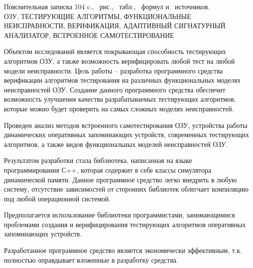 \thispagestyle{empty}

\begin{center}
Пояснительная записка 104 c., \totfig{}~рис., \tottab{}~табл., \toteq{}~формул и \totref{}~источников.\\
\MakeUppercase{ОЗУ, тестирующие алгоритмы, функциональные неисправности, верификация, адаптивный сигнатурный анализатор, встроенное самотестирование}
\end{center}

Объектом исследований является покрывающая способность тестирующих алгоритмов ОЗУ, а также возможность верифицировать любой тест на любой модели неисправности.
Цель работы -- разработка программного средства верификации алгоритмов тестирования на различных функциональных моделях неисправностей ОЗУ.
Создание данного программного средства обеспечит возможность улучшения качества разрабатываемых тестирующих алгоритмов, которые можно будет проверить на самых сложных моделях неисправностей.

Проведен анализ методов встроенного самотестирования ОЗУ, устройства работы динамических оперативных запоминающих устройств, современных тестирующих алгоритмов, а также видов функциональных моделей неисправностей ОЗУ.

Результатом разработки стала библиотека, написанная на языке программирования С++, которая содержит в себе классы симулятора динамической памяти. Данное программное средство легко внедрить в любую систему, отсутствие зависимостей от сторонних библиотек облегчает компиляцию под любой операционной системой. 

Предполагается использование библиотеки программистами, занимающимися проблемами создания и верифицирования тестирующих алгоритмов оперативных запоминающих устройств.

Разработанное программное средство является экономически эффективным, т.к. полностью оправдывает вложенные в разработку средства. 

\clearpage
